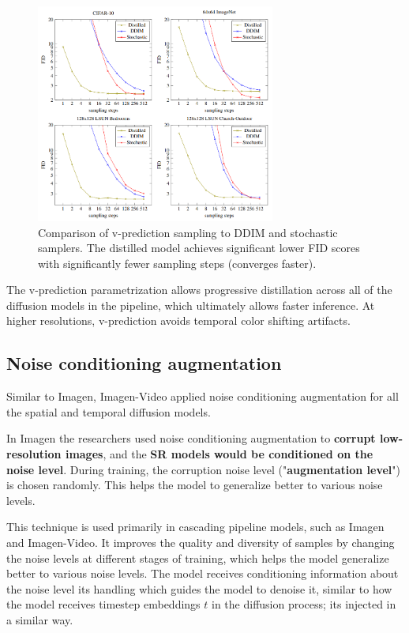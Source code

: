 \begin{figure}
    \centering
    \includegraphics[width=0.7\textwidth]{images/imagen_video/samplers_comparison.png}
    \caption{Comparison of v-prediction sampling to DDIM and stochastic samplers. The distilled model achieves significant lower FID scores with significantly fewer sampling steps (converges faster).}
\end{figure}

The v-prediction parametrization allows progressive distillation across all of the diffusion models in the pipeline, which ultimately allows faster inference. At higher resolutions, v-prediction avoids temporal color shifting artifacts.












\subsection{Noise conditioning augmentation}

Similar to Imagen, Imagen-Video applied noise conditioning augmentation for all the spatial and temporal diffusion models.

In Imagen the researchers used noise conditioning augmentation to \textbf{corrupt low-resolution images}, and the \textbf{SR models would be conditioned on the noise level}. During training, the corruption noise level ("\textbf{augmentation level}") is chosen randomly. This helps the model to generalize better to various noise levels.

This technique is used primarily in cascading pipeline models, such as Imagen and Imagen-Video. It improves the quality and diversity of samples by changing the noise levels at different stages of training, which helps the model generalize better to various noise levels. The model receives conditioning information about the noise level its handling which guides the model to denoise it, similar to how the model receives timestep embeddings $t$ in the diffusion process; its injected in a similar way.

